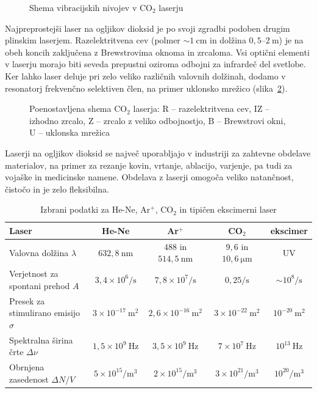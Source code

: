 \begin{figure}[h]
\centering
\def\svgwidth{95truemm} 

\caption{Shema vibracijskih nivojev v CO$_2$ laserju}
\label{fig:CO2E}
\end{figure}

Najpreprostejši laser na ogljikov dioksid  
je po svoji zgradbi podoben drugim plinskim laserjem. 
Razelektritvena cev (polmer $\sim 1~\si{\centi\metre}$ in dolžina $0,5$--$2~\si{\metre}$) 
je na obeh koncih zaključena z Brewstrovima oknoma in zrcaloma. Vsi optični elementi
v laserju morajo biti seveda prepustni oziroma odbojni za infrardeč del svetlobe. Ker lahko 
laser deluje pri zelo veliko različnih valovnih dolžinah, dodamo v resonatorj frekvenčno selektiven
člen, na primer uklonsko mrežico (slika~\ref{fig:CO2S}).

\begin{figure}[h]
\centering
\def\svgwidth{110truemm} 

\caption{Poenostavljena shema  CO$_2$ laserja: R -- razelektritvena cev, 
IZ -- izhodno zrcalo, Z -- zrcalo z veliko odbojnostjo, B -- Brewstrovi okni, 
U -- uklonska mrežica
}
\label{fig:CO2S}
\end{figure}

Laserji na ogljikov dioksid se največ uporabljajo v industriji za zahtevne 
obdelave materialov, na primer za rezanje 
kovin, vrtanje, ablacijo, varjenje, pa tudi za vojaške in medicinske namene.
Obdelava z laserji omogoča veliko natančnost, čistočo in je zelo fleksibilna.

\begin{table}
\small
\begin{center}
\begin{tabular}{|l|c|c|c|c|}\hline
Laser & He-Ne & Ar$^+$ & CO$_2$ & ekscimer\\ \hline
Valovna dolžina  $\lambda$ & $632,8~\si{\nano\metre}$& $488$ in
$514,5~\si{\nano\metre}$ & $9,6$ in $10,6~\si{\micro\metre}$ & UV
\\ \hline
Verjetnost za spontani prehod $A$ & $3,4 \times 10^6/\si{\second}$ & 
$7,8 \times 10^7/\si{\second}$ & $0,25/\si{\second}$ & $\sim 10^8/\si{\second}$ \\ \hline
Presek za stimulirano emisijo $\sigma$ & $3 \times 10^{-17}~\si{\metre}^2$&  $2,6 \times 10^{-16}~\si{\metre}^2$ & $3 \times 10^{-22}~\si{\metre}^2$ & $ 10^{-20}~\si{\metre}^2$ \\ \hline
Spektralna širina črte $\Delta \nu$ & $1,5 \times 10^{9}~\si{\hertz}$ & 
$3,5 \times 10^{9}~\si{\hertz}$ &$7 \times 10^{7}~\si{\hertz}$ & $10^{13}~\si{\hertz}$ \\ \hline
Obrnjena zasedenost $\Delta N/V$ & $5 \times 10^{15}/\si{\metre}^3$ & $2 \times 10^{15}/\si{\metre}^3$ & $3 \times 10^{21}/\si{\metre}^3$ & $10^{20}/\si{\metre}^3$\\ \hline
\end{tabular}
\caption{Izbrani podatki za He-Ne, Ar$^+$, CO$_2$ in tipičen ekscimerni laser}
\label{tab:Ar}
\end{center}
\end{table}

